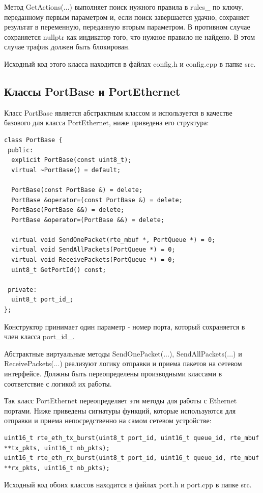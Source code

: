 Метод GetActions(...) выполняет поиск нужного правила в rules\_ по ключу, переданному первым параметром и, если поиск завершается удачно, сохраняет результат в переменную, переданную вторым параметром. В противном случае сохраняется nullptr как индикатор того, что нужное правило не найдено. В этом случае трафик должен быть блокирован.

Исходный код этого класса находится в файлах config.h и config.cpp в папке src.

\subsection{Классы PortBase и PortEthernet}
Класс PortBase является абстрактным классом и используется в качестве базового для класса PortEthernet, ниже приведена его структура:
\begin{lstlisting}
class PortBase {
 public:
  explicit PortBase(const uint8_t);
  virtual ~PortBase() = default;

  PortBase(const PortBase &) = delete;
  PortBase &operator=(const PortBase &) = delete;
  PortBase(PortBase &&) = delete;
  PortBase &operator=(PortBase &&) = delete;

  virtual void SendOnePacket(rte_mbuf *, PortQueue *) = 0;
  virtual void SendAllPackets(PortQueue *) = 0;
  virtual void ReceivePackets(PortQueue *) = 0;
  uint8_t GetPortId() const;

 private:
  uint8_t port_id_;
};
\end{lstlisting}

Конструктор принимает один параметр - номер порта, который сохраняется в член класса port\_id\_.

Абстрактные виртуальные методы SendOnePacket(...), SendAllPackets(...) и ReceivePackets(...) реализуют логику отправки и приема пакетов на сетевом интерфейсе. Должны быть переопределены производными классами в соответствие с логикой их работы.

Так класс PortEthernet переопределяет эти методы для работы с Ethernet портами. Ниже приведены сигнатуры функций, которые используются для отправки и приема непосредственно на самом сетевом устройстве:
\begin{lstlisting}
uint16_t rte_eth_tx_burst(uint8_t port_id, uint16_t queue_id, rte_mbuf **tx_pkts, uint16_t nb_pkts);
uint16_t rte_eth_rx_burst(uint8_t port_id, uint16_t queue_id, rte_mbuf **rx_pkts, uint16_t nb_pkts);
\end{lstlisting}

Исходный код обоих классов находится в файлах port.h и port.cpp в папке src.

